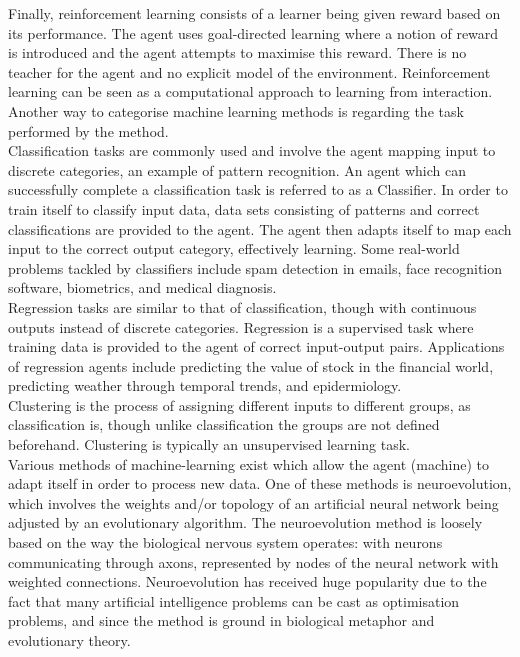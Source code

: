 \documentclass[12pt,a4paper]{article}
\begin{document}
Finally, reinforcement learning consists of a learner being given reward based on its performance. The agent uses goal-directed learning where a notion of reward is introduced and the agent attempts to maximise this reward. There is no teacher for the agent and no explicit model of the environment. Reinforcement learning can be seen as a computational approach to learning from interaction. \cite{reinforce}
\newpage
Another way to categorise machine learning methods is regarding the task performed by the method.\\

Classification tasks are commonly used and involve the agent mapping input to discrete categories, an example of pattern recognition. An agent which can successfully complete a classification task is referred to as a Classifier. In order to train itself to classify input data, data sets consisting of patterns and correct classifications are provided to the agent. The agent then adapts itself to map each input to the correct output category, effectively learning. Some real-world problems tackled by classifiers include spam detection in emails, face recognition software, biometrics, and medical diagnosis. \\

Regression tasks are similar to that of classification, though with continuous outputs instead of discrete categories. Regression is a supervised task where training data is provided to the agent of correct input-output pairs. Applications of regression agents include predicting the value of stock in the financial world, predicting weather through temporal trends, and epidermiology.\\

Clustering is the process of assigning different inputs to different groups, as classification is, though unlike classification the groups are not defined beforehand. Clustering is typically an unsupervised learning task.\\

Various methods of machine-learning exist which allow the agent (machine) to adapt itself in order to process new data. One of these methods is neuroevolution, which involves the weights and/or topology of an artificial neural network being adjusted by an evolutionary algorithm. The neuroevolution method is loosely based on the way the biological nervous system operates: with neurons communicating through axons, represented by nodes of the neural network with weighted connections. Neuroevolution has received huge popularity due to the fact that many artificial intelligence problems can be cast as optimisation problems, and since the method is ground in biological metaphor and evolutionary theory. \cite{risi}\\
\end{document}
